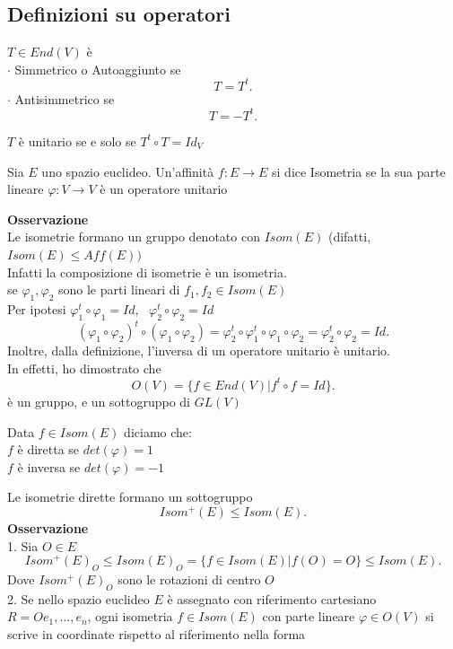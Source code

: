 \documentclass[12px]{article}
\begin{document}
	\subsection{Definizioni su operatori}
	\begin{defi}
		$T\in End(V)$ è \\
		$\cdot$ Simmetrico o Autoaggiunto se
		\[
		T = T^t
		.\] 
		$\cdot$ Antisimmetrico se
		\[
		T = -T^t
		.\] 
	\end{defi}
	\begin{prop}
		$T$ è unitario se e solo se $T^t\circ T = Id_V$
	\end{prop}
	\newpage
	\begin{defi}
		Sia $E$ uno spazio euclideo. Un'affinità $f:E \rightarrow E$ si dice Isometria se la sua parte lineare $\varphi: V \rightarrow V$ è un operatore unitario
	\end{defi}
	\textbf{Osservazione}\\
	Le isometrie formano un gruppo denotato con $Isom(E)$ (difatti, $Isom(E) \leq Aff(E))$\\
	Infatti la composizione di isometrie è un isometria.\\
	se $\varphi_1,\varphi_2$ sono le parti lineari di $f_1,f_2\in Isom(E)$\\
	Per ipotesi $\varphi_1^t\circ \varphi_1 = Id, \ \ \ \varphi_2^t\circ \varphi_2 = Id$ \\
	\[
		(\varphi_1\circ \varphi_2)^t\circ(\varphi_1\circ \varphi_2) = \varphi_2^t\circ \varphi_1^t\circ \varphi_1\circ \varphi_2 = \varphi_2^t\circ \varphi_2 = Id
	.\] 
	Inoltre, dalla definizione, l'inversa di un operatore unitario è unitario.\\
	In effetti, ho dimostrato che 
	\[
		O(V) = \{f\in End(V)|f^t\circ f = Id\}
	.\] 
	è un gruppo, e un sottogruppo di $GL(V)$\\
 \begin{nome}
 	Data $f\in Isom(E)$ diciamo che:\\
	$f$ è diretta se $det(\varphi) = 1$ \\
	$f$ è inversa se $det(\varphi) = -1$
 \end{nome}
 Le isometrie dirette formano un sottogruppo
 \[
 Isom^+(E)\leq Isom(E)
 .\] 
 \textbf{Osservazione}
\\
1. Sia $O\in E$ 
\[
 Isom^+(E)_O\leq Isom(E)_O = \{f\in Isom(E)|f(O) = O\} \leq Isom(E)
.\] 
Dove $Isom^+(E)_O$ sono le rotazioni di centro $O$ \\
2. Se nello spazio euclideo $E$ è assegnato con riferimento cartesiano $R = Oe_1,\ldots,e_n$, ogni isometria $f\in Isom(E)$ con parte lineare $\varphi\in O(V)$ si scrive in coordinate rispetto al riferimento nella forma
\end{document}
